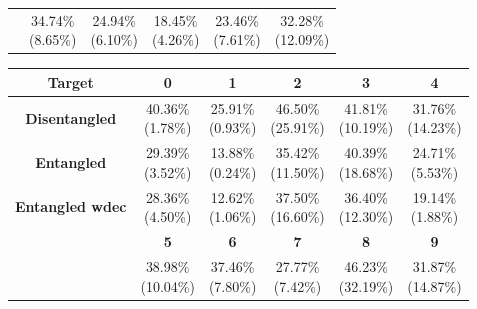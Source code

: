 \documentclass{report}
\begin{document}
\begin{center}
{\begin{tabular}{c|c|c|c|c|c|}
  & \makecell{34.74\% \\ (8.65\%)} & \makecell{24.94\% \\ (6.10\%)} & \makecell{18.45\% \\ (4.26\%)} & \cellcolor{light-gray} \makecell{23.46\% \\ (7.61\%)} & \makecell{32.28\% \\ (12.09\%)} \\ \cline{2-6}
  \end{tabular}
}
\end{center}

\begin{center}
{\tiny
  \begin{tabular}{c|c|c|c|c|c|}
  \hline
  \multicolumn{1}{|c|}{\textbf{Target}} & \textbf{0} & \textbf{1} & \textbf{2} & \textbf{3} & \textbf{4} \\ \hline
  \multicolumn{1}{|c|}{\textbf{Disentangled}} & \cellcolor{light-gray} \makecell{40.36\% \\ (1.78\%)} &  \cellcolor{light-gray} \makecell{25.91\% \\ (0.93\%)} &  \cellcolor{light-gray} \makecell{46.50\% \\ (25.91\%)} & \cellcolor{light-gray} \makecell{41.81\% \\ (10.19\%)} & \cellcolor{light-gray} \makecell{31.76\% \\ (14.23\%)} \\ \hline
  \multicolumn{1}{|c|}{\textbf{Entangled}} & \makecell{29.39\% \\ (3.52\%)} & \makecell{13.88\% \\ (0.24\%)} & \makecell{35.42\% \\ (11.50\%)} & \makecell{40.39\% \\ (18.68\%)} & \makecell{24.71\% \\ (5.53\%)} \\ \hline
  \multicolumn{1}{|c|}{\textbf{Entangled wdec}} & \makecell{28.36\% \\ (4.50\%)} & \makecell{12.62\% \\ (1.06\%)} & \makecell{37.50\% \\ (16.60\%)} & \makecell{36.40\% \\ (12.30\%)} & \makecell{19.14\% \\ (1.88\%)} \\ \hline
  & \textbf{5} & \textbf{6} & \textbf{7} & \textbf{8} & \textbf{9} \\ \cline{2-6}
  & \cellcolor{light-gray} \makecell{38.98\% \\ (10.04\%)} & \cellcolor{light-gray} \makecell{37.46\% \\ (7.80\%)} & \makecell{27.77\% \\ (7.42\%)} & \cellcolor{light-gray} \makecell{46.23\% \\ (32.19\%)} & \cellcolor{light-gray} \makecell{31.87\% \\ (14.87\%)} \\ \cline{2-6}

\end{tabular}}
\end{center}
\end{document}
